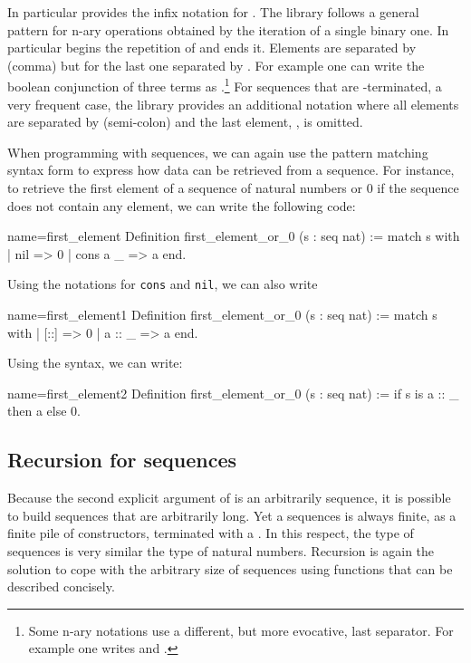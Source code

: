 In particular \Coq{} provides the infix notation \C{::} for
.  The \mcbMC{} library follows a general pattern for
n-ary operations obtained by the iteration of a single binary one. In
particular \C{[::} begins the repetition
of \C{::} and \C{]} ends it.  Elements are separated by \C{,} (comma)
but for the last one separated by \C{&}.
For example one
can write  the boolean conjunction
of three terms as .\footnote{Some n-ary
  notations use a different, but more evocative, last separator.  For
  example one writes \C{[|| b1, b2 | b3]} and \C{[==> b1, b2 => b3]}.}
\index[coq]{\C{["|"| .. , .. "| ..]}}
\index[coq]{\C{[&& .. , .. & ..]}}
\index[coq]{\C{[==> .. , .. => ..]}}
For sequences that are -terminated, a very frequent case,
the \mcbMC{} library provides an additional notation where all elements are
separated by \C{;} (semi-colon) and the last element, ,
is omitted.
\index[coq]{\C{[seq .. ; ..]}}

When programming with sequences, we can again use the  pattern matching
syntax form to express how data can be retrieved from a sequence.  For
instance, to retrieve the first element of a sequence of natural numbers
or 0 if the sequence does not contain any element, we can write the
following code:

\begin{coq}{name=first_element}{}
Definition first_element_or_0 (s : seq nat) :=
  match s with
  | nil => 0
  | cons a _ => a
  end.
\end{coq}
Using the notations for {\tt cons} and {\tt nil}, we can also write

\begin{coq}{name=first_element1}{}
Definition first_element_or_0 (s : seq nat) :=
  match s with
  | [::] => 0
  | a :: _ => a
  end.
\end{coq}
Using the  syntax, we can write:

\begin{coq}{name=first_element2}{}
Definition first_element_or_0 (s : seq nat) :=
  if s is a :: _ then a else 0.
\end{coq}



\subsection{Recursion for sequences}
Because the second explicit argument of  is an arbitrarily
sequence, it is possible to build sequences that are arbitrarily long.
Yet a sequences is always finite, as a finite pile of 
constructors, terminated with a .
In this respect, the type  of sequences is very similar the
type  of natural numbers.  Recursion is again the solution to
cope with the arbitrary
size of sequences using functions that can be described concisely.

